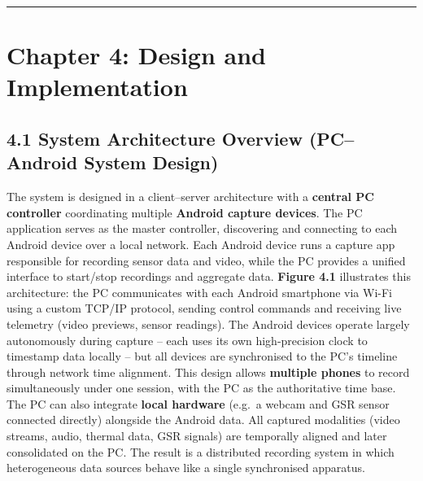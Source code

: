 \documentclass[12pt,a4paper]{article}
\begin{document}
\begin{center}\rule{0.5\linewidth}{0.5pt}\end{center}

\newpage

\section{Chapter 4: Design and Implementation}\label{chapter-4-design-and-implementation}

\subsection{4.1 System Architecture Overview (PC--Android System Design)}\label{system-architecture-overview-pcandroid-system-design}

The system is designed in a client--server architecture with a \textbf{central PC controller} coordinating multiple \textbf{Android capture devices}. The PC application serves as the master controller, discovering and connecting to each Android device over a local network. Each Android device runs a capture app responsible for recording sensor data and video, while the PC provides a unified interface to start/stop recordings and aggregate data. \textbf{Figure 4.1} illustrates this architecture: the PC communicates with each Android smartphone via Wi-Fi using a custom TCP/IP protocol, sending control commands and receiving live telemetry (video previews, sensor readings). The Android devices operate largely autonomously during capture -- each uses its own high-precision clock to timestamp data locally -- but all devices are synchronised to the PC's timeline through network time alignment. This design allows \textbf{multiple phones} to record simultaneously under one session, with the PC as the authoritative time base. The PC can also integrate \textbf{local hardware} (e.g.~a webcam and GSR sensor connected directly) alongside the Android data. All captured modalities (video streams, audio, thermal data, GSR signals) are temporally aligned and later consolidated on the PC. The result is a distributed recording system in which heterogeneous data sources behave like a single synchronised apparatus.
\end{document}

